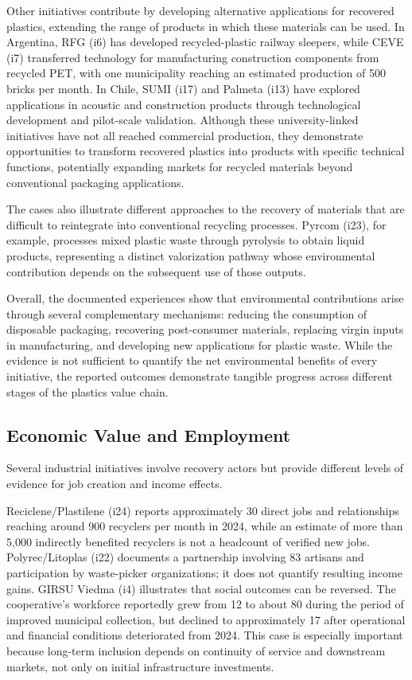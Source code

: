 \documentclass[
  12pt,
  oneside]{book}
\begin{document}
Other initiatives contribute by developing alternative applications for
recovered plastics, extending the range of products in which these
materials can be used. In Argentina, RFG (i6) has developed
recycled-plastic railway sleepers, while CEVE (i7) transferred
technology for manufacturing construction components from recycled PET,
with one municipality reaching an estimated production of 500 bricks per
month. In Chile, SUMI (i17) and Palmeta (i13) have explored applications
in acoustic and construction products through technological development
and pilot-scale validation. Although these university-linked initiatives
have not all reached commercial production, they demonstrate
opportunities to transform recovered plastics into products with
specific technical functions, potentially expanding markets for recycled
materials beyond conventional packaging applications.

The cases also illustrate different approaches to the recovery of
materials that are difficult to reintegrate into conventional recycling
processes. Pyrcom (i23), for example, processes mixed plastic waste
through pyrolysis to obtain liquid products, representing a distinct
valorization pathway whose environmental contribution depends on the
subsequent use of those outputs.

Overall, the documented experiences show that environmental
contributions arise through several complementary mechanisms: reducing
the consumption of disposable packaging, recovering post-consumer
materials, replacing virgin inputs in manufacturing, and developing new
applications for plastic waste. While the evidence is not sufficient to
quantify the net environmental benefits of every initiative, the
reported outcomes demonstrate tangible progress across different stages
of the plastics value chain.

\subsection{Economic Value and
Employment}\label{economic-value-and-employment}

Several industrial initiatives involve recovery actors but provide
different levels of evidence for job creation and income effects.

Reciclene/Plastilene (i24) reports approximately 30 direct jobs and
relationships reaching around 900 recyclers per month in 2024, while an
estimate of more than 5,000 indirectly benefited recyclers is not a
headcount of verified new jobs. Polyrec/Litoplas (i22) documents a
partnership involving 83 artisans and participation by waste-picker
organizations; it does not quantify resulting income gains. GIRSU Viedma
(i4) illustrates that social outcomes can be reversed. The cooperative's
workforce reportedly grew from 12 to about 80 during the period of
improved municipal collection, but declined to approximately 17 after
operational and financial conditions deteriorated from 2024. This case
is especially important because long-term inclusion depends on
continuity of service and downstream markets, not only on initial
infrastructure investments.
\end{document}
